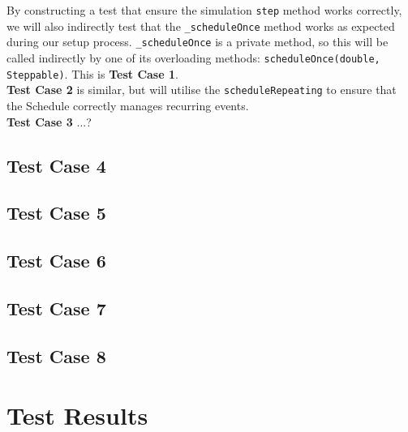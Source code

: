 \documentclass[11pt]{article}
\begin{document}
By constructing a test that ensure the simulation \texttt{step} method works correctly, we will also indirectly test that the \texttt{\_scheduleOnce} method works as expected during our setup process. \texttt{\_scheduleOnce} is a private method, so this will be called indirectly by one of its overloading methods: \texttt{scheduleOnce(double, Steppable)}. This is \textbf{Test Case 1}.
\\

\textbf{Test Case 2} is similar, but will utilise the \texttt{scheduleRepeating} to ensure that the Schedule correctly manages recurring events.
\\

\textbf{Test Case 3} ...?
\\

\subsection{Test Case 4}
\subsection{Test Case 5}
\subsection{Test Case 6}
\subsection{Test Case 7}
\subsection{Test Case 8}

\section{Test Results}%
\end{document}
